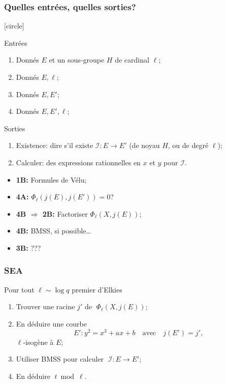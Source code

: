 \documentclass[10pt]{beamer}
\newcommand{\0}{\mathcal{O}}  %
\newcommand{\isog}[1]{\mathcal{#1}}  %
\newcommand{\I}{\isog{I}}  %
\begin{document}
\begin{frame}
  \frametitle{Quelles entrées, quelles sorties?}

  [circle]
  \begin{block}{Entrées}
    \begin{enumerate}
    \item Donnés $E$ et un sous-groupe $H$ de cardinal $\ell$;
    \item Donnés $E, \ell$;
    \item Donnés $E, E'$;
    \item Donnés $E, E', \ell$;
    \end{enumerate}
  \end{block}

  \begin{block}{Sorties}
    \renewcommand{\insertenumlabel}{\Alph{enumi}}
    \begin{enumerate}
    \item Existence: dire s'il existe $\I:E\to E'$ (de noyau $H$, ou de degré $\ell$);
    \item Calculer: des expressions rationnelles en $x$ et $y$ pour $\I$.
    \end{enumerate}
  \end{block}

  \begin{itemize}
  \item \textbf{1B:} Formules de Vélu;
  \item \textbf{4A:} $\Phi_\ell(j(E),j(E')) = 0$?
  \item \textbf{4B $\Rightarrow$ 2B:} Factoriser $\Phi_\ell(X,j(E))$;
  \item \textbf{4B:} BMSS, si possible\dots
  \item \textbf{3B:} ???
  \end{itemize}
\end{frame}



\begin{frame}
  \frametitle{SEA}

  Pour tout $\ell\sim\log q$ premier d'Elkies
  \begin{enumerate}
  \item Trouver une racine $j'$ de $\;\Phi_\ell(X,j(E))$;
  \item \alert<2>{En déduire une courbe \[E':y^2=x^3+ax+b\quad\text{avec}\quad j(E')=j'\text{,}\] $\ell$-isogène à $E$};
  \item \alert<2>{Utiliser BMSS pour calculer $\;\I:E\to E'$};
  \item En déduire $\;t\bmod\ell$.
  \end{enumerate}
\end{frame}
\end{document}
